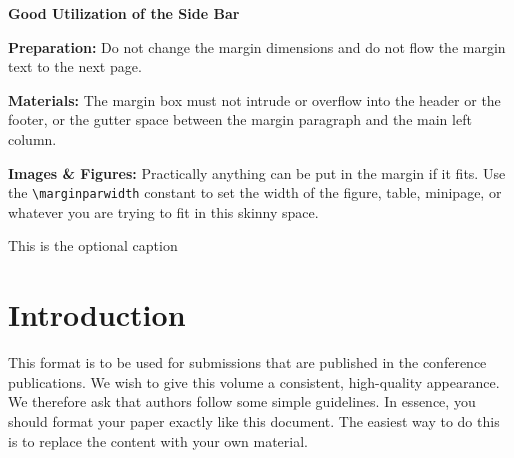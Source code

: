 \documentclass[sigchi-a, authorversion]{acmart}
\begin{document}


\begin{abstract}
  UPDATED---\today. This sample paper describes the formatting
  requirements for SIGCHI Extended Abstract Format, and this sample
  file offers recommendations on writing for the worldwide SIGCHI
  readership. Please review this document even if you have submitted
  to SIGCHI conferences before, as some format details have changed
  relative to previous years. Abstracts should be about 150
  words. Required.
\end{abstract}





\maketitle

\begin{sidebar}
  \textbf{Good Utilization of the Side Bar} 
  
  \textbf{Preparation:} Do not change the margin
  dimensions and do not flow the margin text to the
  next page. 
  
  \textbf{Materials:} The margin box must not intrude
  or overflow into the header or the footer, or the gutter space
  between the margin paragraph and the main left column. 
  
  \textbf{Images \& Figures:} Practically anything
  can be put in the margin if it fits. Use the
  \texttt{{\textbackslash}marginparwidth} constant to set the
  width of the figure, table, minipage, or whatever you are trying
  to fit in this skinny space.

  \caption{This is the optional caption}
  \label{bar:sidebar}
\end{sidebar}



\section{Introduction}
This format is to be used for submissions that are published in the
conference publications. We wish to give this volume a consistent,
high-quality appearance. We therefore ask that authors follow some
simple guidelines. In essence, you should format your paper exactly
like this document. The easiest way to do this is to replace the
content with your own material.
\end{document}
